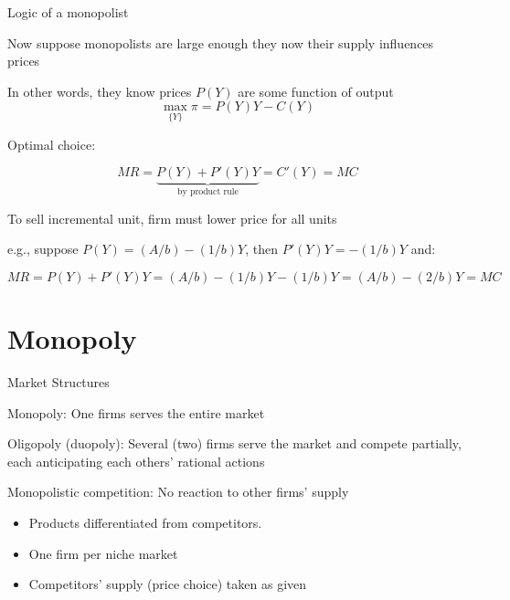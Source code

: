 \documentclass[notes,11pt, aspectratio=169, xcolor=table]{beamer}
\newenvironment{wideitemize}{\itemize\addtolength{\itemsep}{10pt}}{\enditemize}
\begin{document}
\begin{frame}{Logic of a monopolist}

  \begin{wideitemize}
      \item Now suppose monopolists are large enough they now their supply influences prices
      \item In other words, they know prices $P(Y)$ are some function of output
      \begin{equation*}
        \max_{\{Y\}} \pi = P(Y) Y - C(Y) 
    \end{equation*}


      \item<2-> Optimal choice:

      \begin{equation*}
          MR = \underbrace{P(Y) + P'(Y)Y}_{\text{by product rule}} = C'(Y) = MC
      \end{equation*}

      \item<3-> To sell incremental unit, firm must lower price for all units 

      \item<4-> e.g., suppose $P(Y) = (A/b) - (1/b)Y$, then $P'(Y)Y =  - (1/b)Y$ and:

      \begin{equation*}
          MR = P(Y) + P'(Y)Y= (A/b) - (1/b)Y - (1/b)Y = (A/b) - (2/b)Y = MC 
      \end{equation*}

      
  \end{wideitemize}

  
\end{frame}


\section{Monopoly}

\begin{frame}{Market Structures}

\begin{wideitemize}
    \item Monopoly: One firms serves the entire market
    \item<2-> Oligopoly (duopoly): Several (two) firms serve the market and compete partially, each anticipating each others’ rational actions
    \item<3-> Monopolistic competition: No reaction to other firms’ supply
    \begin{itemize}
        \item Products differentiated from competitors.
        \item One firm per niche market
        \item Competitors’ supply (price choice) taken as given
    \end{itemize}

\end{wideitemize}

\end{frame}
\end{document}
